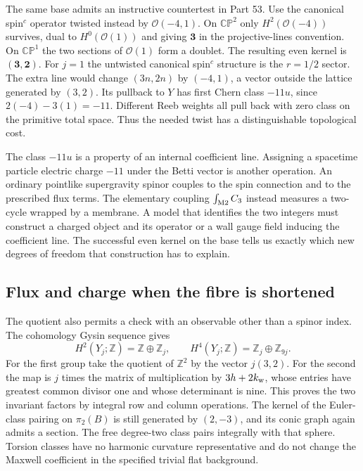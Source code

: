 \documentclass[aps,prd,reprint,onecolumn,nofootinbib,amsmath,amssymb]{revtex4-2}
\begin{document}
The same base admits an instructive countertest in Part 53. Use the canonical spin$^c$ operator twisted instead by $\mathcal O(-4,1)$. On $\mathbb{CP}^2$ only $H^2(\mathcal O(-4))$ survives, dual to $H^0(\mathcal O(1))$ and giving $\mathbf3$ in the projective-lines convention. On $\mathbb{CP}^1$ the two sections of $\mathcal O(1)$ form a doublet. The resulting even kernel is $(\mathbf3,\mathbf2)$. For $j=1$ the untwisted canonical spin$^c$ structure is the $r=1/2$ sector. The extra line would change $(3n,2n)$ by $(-4,1)$, a vector outside the lattice generated by $(3,2)$. Its pullback to $Y$ has first Chern class $-11u$, since $2(-4)-3(1)=-11$. Different Reeb weights all pull back with zero class on the primitive total space. Thus the needed twist has a distinguishable topological cost.

The class $-11u$ is a property of an internal coefficient line. Assigning a spacetime particle electric charge $-11$ under the Betti vector is another operation. An ordinary pointlike supergravity spinor couples to the spin connection and to the prescribed flux terms. The elementary coupling $\int_{\rm M2}C_3$ instead measures a two-cycle wrapped by a membrane. A model that identifies the two integers must construct a charged object and its operator or a wall gauge field inducing the coefficient line. The successful even kernel on the base tells us exactly which new degrees of freedom that construction has to explain.

\subsection{Flux and charge when the fibre is shortened}
The quotient also permits a check with an observable other than a spinor index. The cohomology Gysin sequence gives
\begin{equation}
 H^2(Y_j;\mathbb Z)=\mathbb Z\oplus\mathbb Z_j,\qquad
 H^4(Y_j;\mathbb Z)=\mathbb Z_j\oplus\mathbb Z_{9j}.
\end{equation}
For the first group take the quotient of $\mathbb Z^2$ by the vector $j(3,2)$. For the second the map is $j$ times the matrix of multiplication by $3h+2k_{\rm w}$, whose entries have greatest common divisor one and whose determinant is nine. This proves the two invariant factors by integral row and column operations. The kernel of the Euler-class pairing on $\pi_2(B)$ is still generated by $(2,-3)$, and its conic graph again admits a section. The free degree-two class pairs integrally with that sphere. Torsion classes have no harmonic curvature representative and do not change the Maxwell coefficient in the specified trivial flat background.
\end{document}

